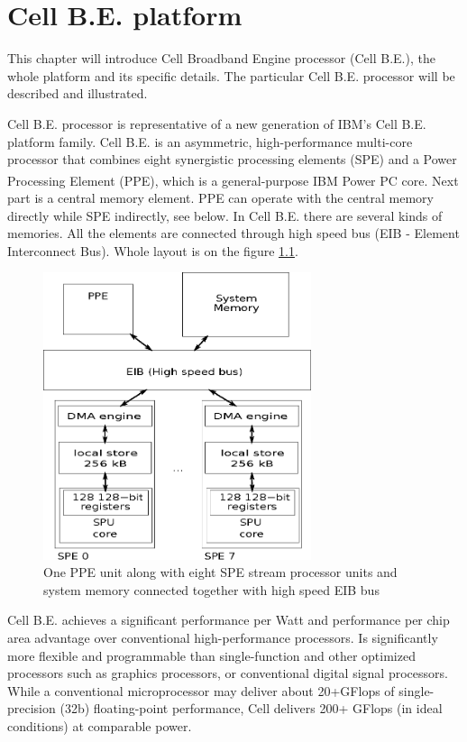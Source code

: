 \chapter{Cell B.E. platform}

This chapter will introduce Cell Broadband Engine processor (Cell B.E.), the whole platform and its specific details.
The particular Cell B.E. processor will be described and illustrated.

\par
Cell B.E. processor is representative of a new generation of IBM's Cell B.E. platform family.
Cell B.E. is an asymmetric, high-performance multi-core processor that combines eight synergistic processing elements (SPE) and a Power Processing Element (PPE), which is a general-purpose IBM Power PC\textsuperscript{\textregistered} core.
Next part is a central memory element.
PPE can operate with the central memory directly while SPE indirectly, see below.
In Cell B.E. there are several kinds of memories.
All the elements are connected through high speed bus (EIB - Element Interconnect Bus).
Whole layout is on the figure \ref{fg:processorLayout}.

\begin{figure}
    \centering
    \includegraphics[width=0.7\textwidth]{data/cellLayout}
    \caption[Cell B.E. processor layout]{One PPE unit along with eight SPE stream processor units and system memory connected together with high speed EIB bus}
    \label{fg:processorLayout}
\end{figure}

Cell B.E. achieves a significant performance per Watt and performance per chip area advantage over conventional high-performance processors.
Is significantly more flexible and programmable than single-function and other optimized processors such as graphics processors, or conventional digital signal processors.
While a conventional microprocessor may deliver about 20+GFlops of single-precision (32b) floating-point performance, Cell delivers 200+ GFlops (in ideal conditions) at comparable power.

